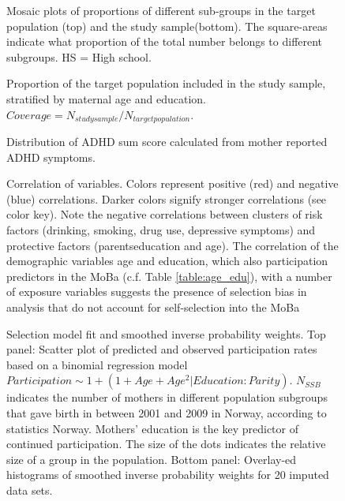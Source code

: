 \documentclass[12pt]{article}
\begin{document}
\begin{figure}[H]
	\centering
	
	\caption{\footnotesize Mosaic plots of proportions of different sub-groups in the target population (top) and the study sample(bottom). The square-areas indicate what proportion of the total number belongs to different subgroups. HS = High school.}
	\label{fig:prop_moba_ssb}
\end{figure}

\begin{figure}[H]
	\centering
	
	\caption{\footnotesize Proportion of the target population included in the study sample, stratified by maternal age and education. $Coverage = N_{study sample}/N_{target population}$.}
	\label{fig:coverage}
\end{figure}


\begin{figure}[H]
	\centering
	
	\caption{\footnotesize Distribution of ADHD sum score calculated from mother reported ADHD symptoms.}
	\label{fig:ADHDsumscore}
\end{figure}

\begin{figure}[H]
	\centering 
	\caption{Correlation of variables. Colors represent positive (red) and negative (blue) correlations. Darker colors signify stronger correlations (see color key). Note the negative correlations between clusters of risk factors (drinking, smoking, drug use, depressive symptoms) and protective factors (parents\textquotesingle \space education and age). The correlation of the  demographic variables age and education, which also participation predictors in the MoBa (c.f. Table \ref{table:age_edu}), with a number of exposure variables suggests the presence of selection bias in analysis that do not account for self-selection into the MoBa}
	\label{fig:covariation}
\end{figure}


\begin{figure}[H]
	\centering
    	
	\caption{Selection model fit and smoothed inverse probability weights. Top panel: Scatter plot of predicted and observed participation rates based on a binomial regression model $Participation \sim 1 + (1 + Age + Age^2 | Education:Parity)$. $N_{SSB}$ indicates the number of mothers in different population subgroups that gave birth in between 2001 and 2009 in Norway, according to statistics Norway. Mothers' education is the key predictor of continued participation. The size of the dots indicates the relative size of a group in the population. Bottom panel: Overlay-ed histograms of smoothed inverse probability weights for 20 imputed data sets.}
	\label{fig:IPW}
\end{figure}
\end{document}
